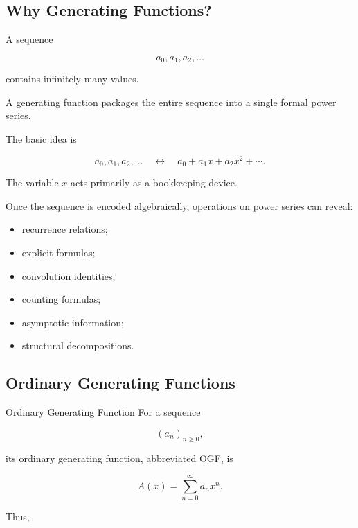 \subsection{Why Generating Functions?}
\label{subsec:why-generating-functions}

A sequence

\[
a_0,a_1,a_2,\ldots
\]

contains infinitely many values.

A generating function packages the entire sequence into a single formal
power series.

The basic idea is

\[
\boxed{
a_0,a_1,a_2,\ldots
\quad\longleftrightarrow\quad
a_0+a_1x+a_2x^2+\cdots.
}
\]

The variable \(x\) acts primarily as a bookkeeping device.

Once the sequence is encoded algebraically, operations on power series
can reveal:

\begin{itemize}
    \item recurrence relations;
    \item explicit formulas;
    \item convolution identities;
    \item counting formulas;
    \item asymptotic information;
    \item structural decompositions.
\end{itemize}

\subsection{Ordinary Generating Functions}
\label{subsec:ordinary-generating-functions}

\begin{definitionbox}{Ordinary Generating Function}
For a sequence

\[
(a_n)_{n\geq0},
\]

its ordinary generating function, abbreviated OGF, is

\[
\boxed{
A(x)
=
\sum_{n=0}^{\infty}a_nx^n.
}
\]
\end{definitionbox}

Thus,

